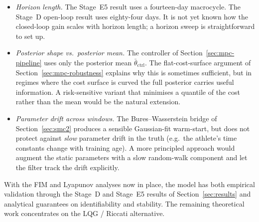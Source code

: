 \begin{itemize}
  \item \emph{Horizon length.} The Stage~E5 result uses a fourteen-day
        macrocycle. The Stage~D open-loop result uses eighty-four days.
        It is not yet known how the closed-loop gain scales with horizon
        length; a horizon sweep is straightforward to set up.
  \item \emph{Posterior shape vs.\ posterior mean.} The controller of
        Section~\ref{sec:mpc-pipeline} uses only the posterior mean
        $\bar\theta_{\mathrm{ctrl}}$. The flat-cost-surface argument of
        Section~\ref{sec:mpc-robustness} explains why this is sometimes
        sufficient, but in regimes where the cost surface is curved the
        full posterior carries useful information. A risk-sensitive
        variant that minimises a quantile of the cost rather than the
        mean would be the natural extension.
  \item \emph{Parameter drift across windows.} The Bures--Wasserstein
        bridge of Section~\ref{sec:smc2} produces a sensible
        Gaussian-fit warm-start, but does not protect against
        \emph{slow} parameter drift in the truth (e.g.\ the athlete's
        time constants change with training age). A more principled
        approach would augment the static parameters with a slow
        random-walk component and let the filter track the drift
        explicitly.
\end{itemize}

\medskip
\noindent
With the FIM and Lyapunov analyses now in place, the model has both
empirical validation through the Stage~D and Stage~E5 results of
Section~\ref{sec:results} and analytical guarantees on identifiability
and stability. The remaining theoretical work concentrates on the
LQG / Riccati alternative.
